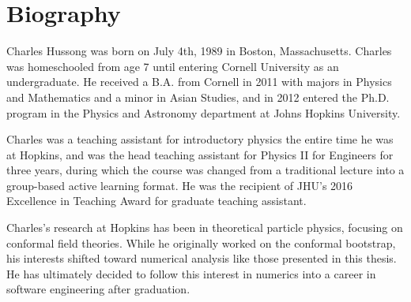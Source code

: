 \documentclass[12pt]{report}
\numberwithin{equation}{section}
\begin{document}
\cleardoublepage %

\begin{refsection}


\cleardoublepage


\cleardoublepage


\cleardoublepage


\cleardoublepage


\cleardoublepage

\printbibliography[title=References]
\end{refsection}

% 

\cleardoublepage
\section{Biography}

Charles Hussong was born on July 4th, 1989 in Boston, Massachusetts. Charles was
homeschooled from age 7 until entering Cornell University as an undergraduate.
He received a B.A. from Cornell in 2011 with majors in Physics and Mathematics
and a minor in Asian Studies, and in 2012 entered the Ph.D. program in the
Physics and Astronomy department at Johns Hopkins University.

Charles was a teaching assistant for introductory physics the entire time he was
at Hopkins, and was the head teaching assistant for Physics II for Engineers for
three years, during which the course was changed from a traditional lecture into
a group-based active learning format. He was the recipient of JHU's 2016 
Excellence in Teaching Award for graduate teaching assistant.

Charles's research at Hopkins has been in theoretical particle physics, focusing
on conformal field theories. While he originally worked on the conformal 
bootstrap, his interests shifted toward numerical analysis like those presented
in this thesis. He has ultimately decided to follow this interest in numerics
into a career in software engineering after graduation.
\end{document}
